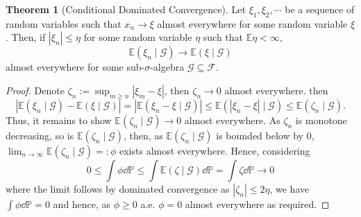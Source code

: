 \documentclass[]{article}
\theoremstyle{definition}
\newtheorem{theorem}{Theorem}
\theoremstyle{definition}
\begin{document}
\begin{theorem}[Conditional Dominated Convergence]
  Let \(\xi_1, \xi_2, \cdots\) be a sequence of random variables such that 
  \(x_n \to \xi\) almost everywhere for some random variable \(\xi\). Then, 
  if \(|\xi_n| \le \eta\) for some random variable \(\eta\) such that 
  \(\mathbb{E}\eta < \infty\), 
  \[\mathbb{E}(\xi_n \mid \mathcal{G}) \to \mathbb{E}(\xi \mid \mathcal{G})\]
  almost everywhere for some sub-\(\sigma\)-algebra 
  \(\mathcal{G} \subseteq \mathcal{F}\).
\end{theorem}
\begin{proof}
  Denote \(\zeta_n := \sup_{m \ge n} |\xi_m - \xi|\), then \(\zeta_n \to 0\) almost 
  everywhere. then
  \[|\mathbb{E}(\xi_n \mid \mathcal{G}) - \mathbb{E}(\xi \mid \mathcal{G})| = 
    |\mathbb{E}(\xi_n - \xi \mid \mathcal{G})| \le 
    \mathbb{E}(|\xi_n - \xi| \mid \mathcal{G}) \le \mathbb{E}(\zeta_n \mid \mathcal{G}).\]
  Thus, it remains to show \(\mathbb{E}(\zeta_n \mid \mathcal{G}) \to 0\) 
  almost everywhere. As \(\zeta_n\) is monotone decreasing, so is 
  \(\mathbb{E}(\zeta_n \mid \mathcal{G})\), then, as \(\mathbb{E}(\zeta_n \mid \mathcal{G})\) 
  is bounded below by 0, \(\lim_{n \to \infty}\mathbb{E}(\zeta_n \mid \mathcal{G}) =: \phi\) 
  exists almost everywhere. Hence, considering 
  \[0 \le \int \phi \dd \mathbb{P} \le \int \mathbb{E}(\zeta \mid \mathcal{G}) \dd \mathbb{P} 
    = \int \zeta \dd \mathbb{P} \to 0\]
  where the limit follows by dominated convergence as \(|\zeta_n| \le 2 \eta\),
  we have \(\int \phi \dd \mathbb{P} = 0\) and hence, as \(\phi \ge 0\) a.e. 
  \(\phi = 0\) almost everywhere as required.
\end{proof}
\end{document}
